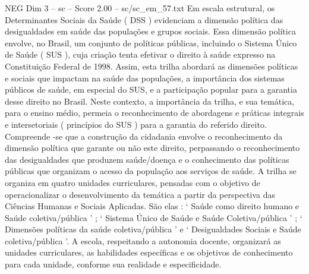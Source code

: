 \begin{textsample}{NEG Dim 3 – sc – Score 2.00 – sc/sc\_em\_57.txt}
Em escala estrutural, os Determinantes Sociais da Saúde ( DSS ) evidenciam a dimensão política das desigualdades em saúde das populações e grupos sociais.
Essa dimensão política envolve, no Brasil, um conjunto de políticas públicas, incluindo o Sistema Único de Saúde ( SUS ), cuja criação tenta efetivar o direito à saúde expresso na Constituição Federal de 1998.
Assim, esta trilha abordará as dimensões políticas e sociais que impactam na saúde das populações, a importância dos sistemas públicos de saúde, em especial do SUS, e a participação popular para a garantia desse direito no Brasil.
Neste contexto, a importância da trilha, e sua temática, para o ensino médio, permeia o reconhecimento de abordagens e práticas integrais e intersetoriais ( princípios do SUS ) para a garantia do referido direito.
Compreende -se que a construção da cidadania envolve o reconhecimento da dimensão política que garante ou não este direito, perpassando o reconhecimento das desigualdades que produzem saúde/doença e o conhecimento das políticas públicas que organizam o acesso da população aos serviços de saúde.
A trilha se organiza em quatro unidades curriculares, pensadas com o objetivo de operacionalizar o desenvolvimento da temática a partir da perspectiva das Ciências Humanas e Sociais Aplicadas.
São elas : ‘ Saúde como direito humano e Saúde coletiva/pública ’ ; ‘ Sistema Único de Saúde e Saúde Coletiva/pública ’ ; ‘ Dimensões políticas da saúde coletiva/pública ’ e ‘ Desigualdades Sociais e Saúde coletiva/pública ’.
A escola, respeitando a autonomia docente, organizará as unidades curriculares, as habilidades específicas e os objetivos de conhecimento para cada unidade, conforme sua realidade e especificidade.

\end{textsample}

